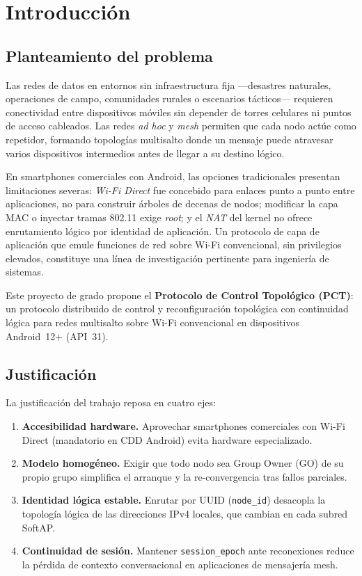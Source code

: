 \chapter{Introducción}
\label{cap:introduccion}

\section{Planteamiento del problema}
\label{sec:planteamiento}

Las redes de datos en entornos sin infraestructura fija ---desastres naturales, operaciones de campo, comunidades rurales o escenarios tácticos--- requieren conectividad entre dispositivos móviles sin depender de torres celulares ni puntos de acceso cableados. Las redes \emph{ad hoc} y \emph{mesh} permiten que cada nodo actúe como repetidor, formando topologías multisalto donde un mensaje puede atravesar varios dispositivos intermedios antes de llegar a su destino lógico.

En smartphones comerciales con Android, las opciones tradicionales presentan limitaciones severas: \emph{Wi-Fi Direct} fue concebido para enlaces punto a punto entre aplicaciones, no para construir árboles de decenas de nodos; modificar la capa MAC o inyectar tramas 802.11 exige \emph{root}; y el \emph{NAT} del kernel no ofrece enrutamiento lógico por identidad de aplicación. Un protocolo de capa de aplicación que emule funciones de red sobre Wi-Fi convencional, sin privilegios elevados, constituye una línea de investigación pertinente para ingeniería de sistemas.

Este proyecto de grado propone el \textbf{Protocolo de Control Topológico (PCT)}: un protocolo distribuido de control y reconfiguración topológica con continuidad lógica para redes multisalto sobre Wi-Fi convencional en dispositivos Android~12+ (API~31).

\section{Justificación}
\label{sec:justificacion}

La justificación del trabajo reposa en cuatro ejes:

\begin{enumerate}[label=\arabic*.]
  \item \textbf{Accesibilidad hardware.} Aprovechar smartphones comerciales con Wi-Fi Direct (mandatorio en CDD Android) evita hardware especializado.
  \item \textbf{Modelo homogéneo.} Exigir que todo nodo sea Group Owner (GO) de su propio grupo simplifica el arranque y la re-convergencia tras fallos parciales.
  \item \textbf{Identidad lógica estable.} Enrutar por UUID (\texttt{node\_id}) desacopla la topología lógica de las direcciones IPv4 locales, que cambian en cada subred SoftAP.
  \item \textbf{Continuidad de sesión.} Mantener \texttt{session\_epoch} ante reconexiones reduce la pérdida de contexto conversacional en aplicaciones de mensajería mesh.
\end{enumerate}

